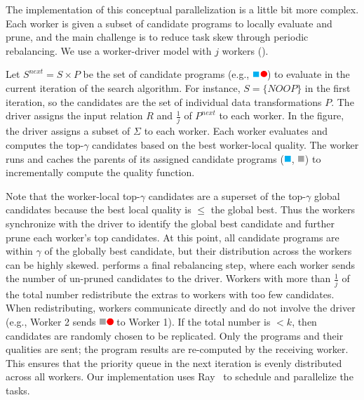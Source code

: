 The implementation of this conceptual parallelization is a little bit more complex. 
Each worker is given a subset of candidate programs to locally evaluate and prune, and the main challenge is to reduce task skew through periodic rebalancing.  We use a worker-driver model with $j$ workers ().

Let $S^{next} = S\times P$ be the set of candidate programs (e.g., \includegraphics[height=8pt]{figures/program.pdf}) to evaluate in the current iteration of the search algorithm. For instance, $S=\{NOOP\}$ in the first iteration, so the candidates are the set of individual data transformations $P$.   The driver assigns the input relation $R$ and $\frac{1}{j}$ of $P^{next}$ to each worker.  In the figure, the driver assigns a subset of $\Sigma$ to each worker.  Each worker evaluates and computes the top-$\gamma$ candidates based on the best worker-local quality.   The worker runs and caches the parents of its assigned candidate programs (\includegraphics[height=8pt]{figures/sq-blue.pdf}, \includegraphics[height=8pt]{figures/sq-grey.pdf}) to incrementally compute the quality function.
  
Note that the worker-local top-$\gamma$ candidates are a superset of the top-$\gamma$ global candidates because the best local quality is $\le$ the global best.   Thus the workers synchronize with the driver to identify the global best candidate and further prune each worker's top candidates.  At this point, all candidate programs are within $\gamma$ of the globally best candidate, but their distribution across the workers can be highly skewed.  \sys performs a final rebalancing step, where each worker sends the number of un-pruned candidates to the driver.  Workers with more than $\frac{1}{j}$ of the total number redistribute the extras to workers with too few candidates.  When redistributing, workers communicate directly and do not involve the driver (e.g., Worker 2 sends \includegraphics[height=8pt]{figures/program-greyred.pdf} to Worker 1).   If the total number is $<k$, then candidates are randomly chosen to be replicated.  Only the programs and their qualities are sent; the program results are re-computed by the receiving worker.  This ensures that the priority queue in the next iteration is evenly distributed across all workers.
Our implementation uses Ray~\cite{ray} to schedule and parallelize the tasks.

